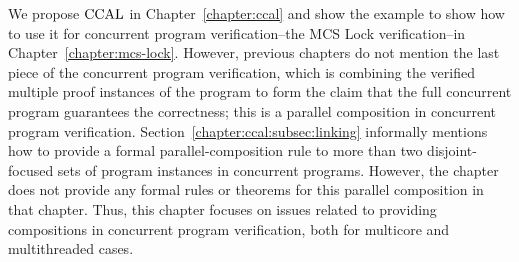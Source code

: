    

We propose $\mathrm{CCAL}$ in Chapter~\ref{chapter:ccal} and show the example to show how to use it for concurrent program verification--the MCS Lock verification--in Chapter~\ref{chapter:mcs-lock}.
However, previous chapters do not mention the last piece of the concurrent program verification, which is
combining the verified multiple proof instances of the program
to form the claim that the full concurrent program guarantees the correctness; this is
 a parallel composition in concurrent program verification.
Section~\ref{chapter:ccal:subsec:linking}
 informally mentions how to provide a formal parallel-composition rule to more than two disjoint-focused sets of program instances in concurrent programs.
However, the chapter does not provide any formal rules or theorems for this parallel composition in that chapter.
Thus, this chapter focuses on  issues related to providing compositions in concurrent program verification,
both for multicore and multithreaded cases.

